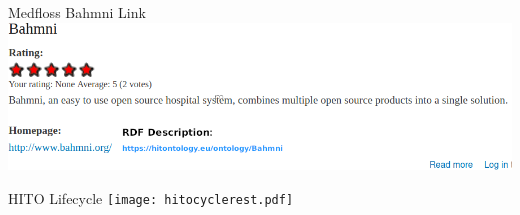 \documentclass[aspectratio=1610,12pt]{beamer}
\begin{document}
\begin{frame}{Medfloss Bahmni Link}
  \includegraphics[width=\textwidth]{img/medfloss-bahmni-link.png}
\end{frame}

\begin{frame}{HITO Lifecycle}
  \centering
  \vspace{-0.5cm}
  \texttt{[image: hitocyclerest.pdf]}
\end{frame}
\end{document}

